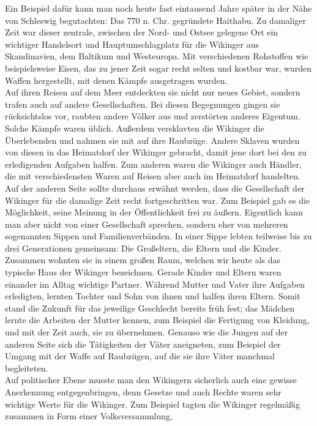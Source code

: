 \documentclass[12pt,a4paper,ngerman,openany]{book}
\begin{document}
Ein Beispiel dafür kann man noch heute fast eintausend Jahre später in der Nähe von Schleswig begutachten: Das 770 n. Chr. gegründete Haithabu. Zu damaliger Zeit war dieser zentrale,
zwischen der Nord- und Ostsee gelegene Ort ein wichtiger Handelsort und Hauptumschlagplatz für die Wikinger aus Skandinavien, dem Baltikum und Westeuropa. Mit verschiedenen Rohstoffen wie beispielsweise Eisen,
das zu jener Zeit sogar recht selten und kostbar war, wurden Waffen hergestellt, mit denen Kämpfe ausgetragen wurden.\\
Auf ihren Reisen auf dem Meer entdeckten sie nicht nur neues Gebiet, sondern trafen auch auf andere Gesellschaften. Bei diesen Begegnungen gingen sie rücksichtslos vor, raubten andere Völker aus und zerstörten anderes Eigentum.
Solche Kämpfe waren üblich. Außerdem versklavten die Wikinger die Überlebenden und nahmen sie mit auf ihre Raubzüge. Andere Sklaven wurden von diesen in das Heimatdorf der Wikinger gebracht, damit jene dort bei den zu erledigenden Aufgaben halfen.
Zum anderen waren die Wikinger auch Händler, die mit verschiedensten Waren auf Reisen aber auch im Heimatdorf handelten.\\
Auf der anderen Seite sollte durchaus erwähnt werden, dass die Gesellschaft der Wikinger für die damalige Zeit recht fortgeschritten war. Zum Beispiel gab es die Möglichkeit, seine Meinung in der Öffentlichkeit frei zu äußern.
Eigentlich kann man aber nicht von einer Gesellschaft sprechen, sondern eher von mehreren sogenannten Sippen und Familienverbänden. In einer Sippe lebten teilweise bis zu drei Generationen gemeinsam: Die Großeltern, die Eltern und die Kinder.
Zusammen wohnten sie in einem großen Raum, welchen wir heute als das typische Haus der Wikinger bezeichnen. Gerade Kinder und Eltern waren einander im Alltag wichtige Partner. Während Mutter und Vater ihre Aufgaben erledigten,
lernten Tochter und Sohn von ihnen und halfen ihren Eltern. Somit stand die Zukunft für das jeweilige Geschlecht bereits früh fest; das Mädchen lernte die Arbeiten der Mutter kennen, zum Beispiel die Fertigung von Kleidung, und mit der Zeit auch, sie zu übernehmen.
Genauso wie die Jungen auf der anderen Seite sich die Tätigkeiten der Väter aneigneten, zum Beispiel der Umgang mit der Waffe auf Raubzügen, auf die sie ihre Väter manchmal begleiteten.\\
Auf politischer Ebene musste man den Wikingern sicherlich auch eine gewisse Anerkennung entgegenbringen, denn Gesetze und auch Rechte waren sehr wichtige Werte für die Wikinger. Zum Beispiel tagten die Wikinger regelmäßig zusammen in Form einer Volksversammlung,
\end{document}
